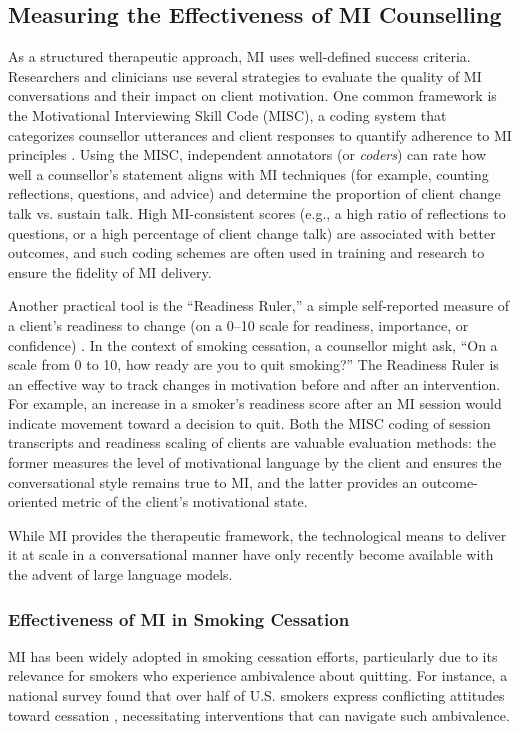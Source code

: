 \subsection*{Measuring the Effectiveness of MI Counselling}
As a structured therapeutic approach, MI uses well-defined success criteria.
Researchers and clinicians use several strategies to evaluate the quality of MI
conversations and their impact on client motivation. One common framework is the
Motivational Interviewing Skill Code (MISC), a coding system that categorizes
counsellor utterances and client responses to quantify adherence to MI principles
\cite{Houck2010}. Using the MISC, independent annotators (or \emph{coders}) can rate
how well a counsellor's statement aligns with MI techniques (for example, counting
reflections, questions, and advice) and determine the proportion of client change talk
vs. sustain talk. High MI-consistent scores (e.g., a high ratio of reflections to
questions, or a high percentage of client change talk) are associated with better
outcomes, and such coding schemes are often used in training and research to ensure the
fidelity of MI delivery.

Another practical tool is the ``Readiness Ruler,'' a simple self-reported measure of a
client’s readiness to change (on a 0–10 scale for readiness, importance, or confidence)
\cite{Boudreaux2012}. In the context of smoking cessation, a counsellor might ask, ``On
a scale from 0 to 10, how ready are you to quit smoking?'' The Readiness Ruler is an
effective way to track changes in motivation before and after an intervention. For
example, an increase in a smoker's readiness score after an MI session would indicate
movement toward a decision to quit. Both the MISC coding of session transcripts and
readiness scaling of clients are valuable evaluation methods: the former measures the
level of motivational language by the client and ensures the conversational style
remains true to MI, and the latter provides an outcome-oriented metric of the client’s
motivational state.

While MI provides the therapeutic framework, the technological means to deliver it at
scale in a conversational manner have only recently become available with the advent of
large language models.

\subsubsection{Effectiveness of MI in Smoking Cessation}
MI has been widely adopted in smoking cessation efforts, particularly due to its
relevance for smokers who experience ambivalence about quitting. For instance, a
national survey found that over half of U.S. smokers express conflicting attitudes
toward cessation \cite{Babb2017}, necessitating interventions that can navigate such
ambivalence.

